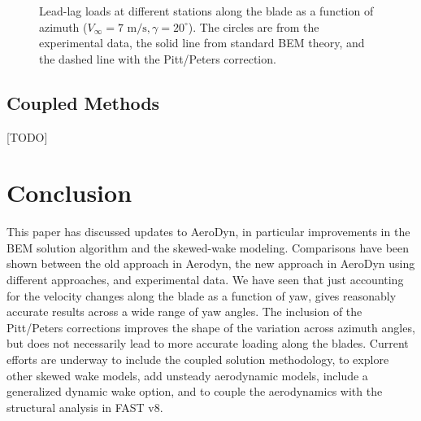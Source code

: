 \documentclass[]{aiaa-tc}%
\begin{document}
\begin{figure}[htbp]
\centering
 \quad
 \quad
 \caption{Lead-lag loads at different stations along the blade as a function of azimuth ($V_\infty = 7 \textrm{ m/s}, \gamma = 20^\circ$). The circles are from the experimental data, the solid line from standard BEM theory, and the dashed line with the Pitt/Peters correction.}
 \label{fig:azimuth_Tp}
\end{figure}

\FloatBarrier
\subsection{Coupled Methods}
[TODO]

\section{Conclusion}

This paper has discussed updates to AeroDyn, in particular improvements in the BEM solution algorithm and the skewed-wake modeling.  Comparisons have been shown between the old approach in Aerodyn, the new approach in AeroDyn using different approaches, and experimental data.  We have seen that just accounting for the velocity changes along the blade as a function of yaw, gives reasonably accurate results across a wide range of yaw angles.  The inclusion of the Pitt/Peters corrections improves the shape of the variation across azimuth angles, but does not necessarily lead to more accurate loading along the blades.  Current efforts are underway to include the coupled solution methodology, to explore other skewed wake models, add unsteady aerodynamic models, include a generalized dynamic wake option, and to couple the aerodynamics with the structural analysis in FAST v8.
\end{document}

